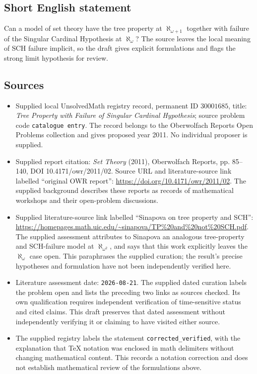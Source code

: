 \documentclass[11pt]{article}
\begin{document}
\subsection{Short English statement}
Can a model of set theory have the tree property at \(\aleph_{\omega+1}\) together with failure of the Singular Cardinal Hypothesis at \(\aleph_\omega\)? The source leaves the local meaning of SCH failure implicit, so the draft gives explicit formulations and flags the strong limit hypothesis for review.
\subsection{Sources}
\begin{itemize}
\item Supplied local UnsolvedMath registry record, permanent ID \(30001685\), title: \emph{Tree Property with Failure of Singular Cardinal Hypothesis}; source problem code \texttt{catalogue entry}. The record belongs to the Oberwolfach Reports Open Problems collection and gives proposed year 2011. No individual proposer is supplied.
\item Supplied report citation: \emph{Set Theory} (2011), Oberwolfach Reports, pp. 85--140, DOI 10.4171/owr/2011/02. Source URL and literature-source link labelled ``original OWR report'': \url{https://doi.org/10.4171/owr/2011/02}. The supplied background describes these reports as records of mathematical workshops and their open-problem discussions.
\item Supplied literature-source link labelled ``Sinapova on tree property and SCH'': \url{https://homepages.math.uic.edu/~sinapova/TP%20and%20not%20SCH.pdf}. The supplied assessment attributes to Sinapova an analogous tree-property and SCH-failure model at \(\aleph_{\omega^2}\), and says that this work explicitly leaves the \(\aleph_\omega\) case open. This paraphrases the supplied curation; the result's precise hypotheses and formulation have not been independently verified here.
\item Literature assessment date: \texttt{2026-08-21}. The supplied dated curation labels the problem open and lists the preceding two links as sources checked. Its own qualification requires independent verification of time-sensitive status and cited claims. This draft preserves that dated assessment without independently verifying it or claiming to have visited either source.
\item The supplied registry labels the statement \texttt{corrected\_verified}, with the explanation that TeX notation was enclosed in math delimiters without changing mathematical content. This records a notation correction and does not establish mathematical review of the formulations above.
\end{itemize}
\end{document}
